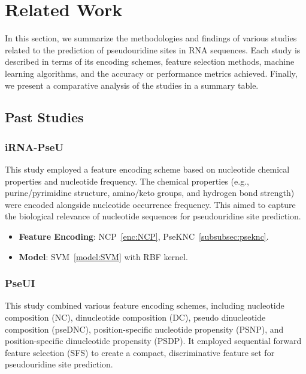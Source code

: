 \chapter{Related Work}\label{ch:related-work}
  In this section, we summarize the methodologies and findings of various studies related to the prediction of pseudouridine sites in RNA sequences.
  Each study is described in terms of its encoding schemes, feature selection methods, machine learning algorithms, and the accuracy or performance metrics achieved.
  Finally, we present a comparative analysis of the studies in a summary table.


  \section{Past Studies}\label{sec:past-studies}

    \subsection*{iRNA-PseU \cite{chen_irna-pseu_nodate}}\label{subsec:iRNA-PseU}
      This study employed a feature encoding scheme based on nucleotide chemical properties and nucleotide frequency.
      The chemical properties (e.g., purine/pyrimidine structure, amino/keto groups, and hydrogen bond strength) were encoded alongside nucleotide occurrence frequency.
      This aimed to capture the biological relevance of nucleotide sequences for pseudouridine site prediction.

      \begin{itemize}
        \item \textbf{Feature Encoding}: NCP~\ref{enc:NCP}, PseKNC~\ref{subsubsec:pseknc}.
        \item \textbf{Model}: SVM~\ref{model:SVM} with RBF kernel.
      \end{itemize}

    \subsection*{PseUI \cite{he_pseui_2018}}\label{subsec:PseUI}
      This study combined various feature encoding schemes, including nucleotide composition (NC), dinucleotide composition (DC), pseudo dinucleotide composition (pseDNC), position-specific nucleotide propensity (PSNP), and position-specific dinucleotide propensity (PSDP). It employed sequential forward feature selection (SFS) to create a compact, discriminative feature set for pseudouridine site prediction.

